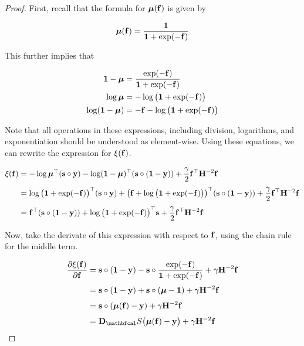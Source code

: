 \begin{proof}

    First, recall that the formula for $\boldsymbol{\mu}(\mathbf{f})$ is given by 

    \begin{equation}
        \boldsymbol{\mu}(\mathbf{f}) = \frac{\mathbf{1}}{\mathbf{1} + \exp(-\mathbf{f})}
    \end{equation}

    This further implies that

    \begin{align}
        \mathbf{1} - \boldsymbol{\mu} &= \frac{\exp(-\mathbf{f})}{\mathbf{1} + \exp(-\mathbf{f})} \\ 
        \log \boldsymbol{\mu} &= - \log\big(\mathbf{1} + \exp(-\mathbf{f}) \big) \\
        \log (\mathbf{1} - \boldsymbol{\mu}) &= - \mathbf{f}- \log\big(\mathbf{1} + \exp(-\mathbf{f}) \big) 
    \end{align}

    Note that all operations in these expressions, including division, logarithms, and exponentiation should be understood as element-wise. Using these equations, we can rewrite the expression for $\xi(\mathbf{f})$. 

    \begin{align*}
        \xi(\mathbf{f}) &= - \log \boldsymbol{\mu}^\top (\mathbf{s} \circ \mathbf{y}) - \log(\mathbf{1} - \boldsymbol{\mu})^\top (\mathbf{s} \circ (\mathbf{1} - \mathbf{y})) + \frac{\gamma}{2} \mathbf{f}^\top \mathbf{H}^{-2} \mathbf{f} \\[0.1cm]
        &= \log\big(\mathbf{1} + \exp(-\mathbf{f})\big)^\top (\mathbf{s} \circ \mathbf{y})  +  \big( \mathbf{f} + \log\big(\mathbf{1} + \exp(-\mathbf{f}) \big)\big)^\top (\mathbf{s} \circ (\mathbf{1} - \mathbf{y}))  + \frac{\gamma}{2} \mathbf{f}^\top \mathbf{H}^{-2} \mathbf{f} \\[0.1cm]
        &= \mathbf{f}^\top (\mathbf{s} \circ (\mathbf{1} - \mathbf{y})) + \log\big(\mathbf{1} + \exp(-\mathbf{f}) \big)^\top \mathbf{s} + \frac{\gamma}{2} \mathbf{f}^\top \mathbf{H}^{-2} \mathbf{f} 
    \end{align*}
    
    Now, take the derivate of this expression with respect to $\mathbf{f}$, using the chain rule for the middle term. 

    \begin{align*}
        \frac{\partial \xi(\f)}{\partial \f} &= \s \circ (\one - \y) - \s \circ \frac{\exp(-\f)}{\one + \exp(-\f)}  + \gamma \HH^{-2} \f \\[0.1cm]
        &= \s \circ (\one - \y) + \s \circ (\muu - \one)  + \gamma \HH^{-2} \f \\[0.1cm]
        &= \s \circ (\muu(\f) - \y) + \gamma \HH^{-2} \f \\[0.1cm]
        &= \D_\St \big(\muu(\f) - \y\big) + \gamma \HH^{-2} \f
    \end{align*}


\end{proof}
